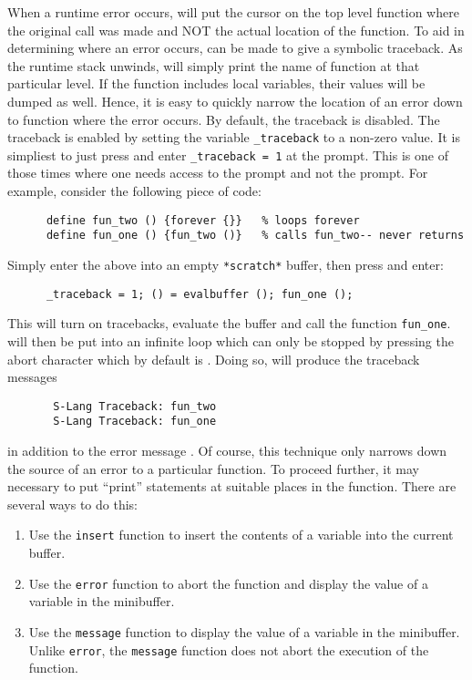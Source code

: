  When a runtime error occurs, \jed{} will put the cursor on the top level
  function where the original call was made and NOT the actual location of
  the function.  To aid in determining where an error occurs, \jed{} can be
  made to give a symbolic traceback.  As the \slang{} runtime stack unwinds,
  \slang{} will simply print the name of function at that particular level.
  If the function includes local variables, their values will be dumped as
  well.  Hence, it is easy to quickly narrow the location of an error down
  to function where the error occurs.  By default, the traceback is
  disabled.  The traceback is enabled by setting the \slang{} variable
  \verb|_traceback| to a non-zero value.  It is simpliest to just press
   and enter \verb|_traceback = 1| at the 
  prompt.  This is one of those times where one needs access to the
   prompt and not the  prompt. For example, consider
  the following piece of code:
\begin{verbatim}
      define fun_two () {forever {}}   % loops forever
      define fun_one () {fun_two ()}   % calls fun_two-- never returns
\end{verbatim}
  Simply enter the above into an empty \jed{} \verb|*scratch*| buffer, then
  press  and enter:
\begin{verbatim} 
      _traceback = 1; () = evalbuffer (); fun_one ();
\end{verbatim} 
  This will turn on tracebacks, evaluate the buffer and call the
  function \verb|fun_one|.  \jed{} will then be put into an infinite loop which
  can only be stopped by pressing the abort character which by default is
  . Doing so, will produce the traceback messages
\begin{verbatim}
       S-Lang Traceback: fun_two
       S-Lang Traceback: fun_one
\end{verbatim}
  in addition to the error message .  Of course, this
  technique only narrows down the source of an error to a particular
  function. To proceed further, it may necessary to put ``print'' statements
  at suitable places in the function.  There are several ways to do this:
\begin{enumerate}
\item Use the \verb|insert| function to insert the contents of a variable
      into the current buffer.

\item Use the \verb|error| function to abort the function and display the
      value of a variable in the minibuffer.

\item Use the \verb|message| function to display the value of a variable in
      the minibuffer.  Unlike \verb|error|, the \verb|message| function does
      not abort the execution of the function.
\end{enumerate}

